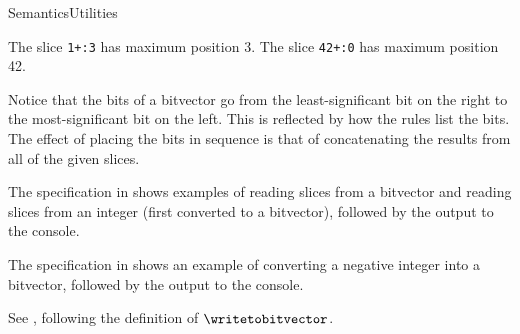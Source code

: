\begin{SemanticsRuleList}{SemanticsUtilities}

The slice \verb|1+:3| has maximum position 3.
The slice \verb|42+:0| has maximum position 42.



Notice that the bits of a bitvector go from the least-significant bit on the right
to the most-significant bit on the left.
This is reflected by how the rules list the bits.
The effect of placing the bits in sequence is that of concatenating the results
from all of the given slices.

The specification in  shows examples of reading slices from a bitvector
and reading slices from an integer (first converted to a bitvector), followed by the output to the console.


The specification in  shows an example of converting a negative
integer into a bitvector, followed by the output to the console.




See , following the definition of $\writetobitvector$.



\end{SemanticsRuleList}
